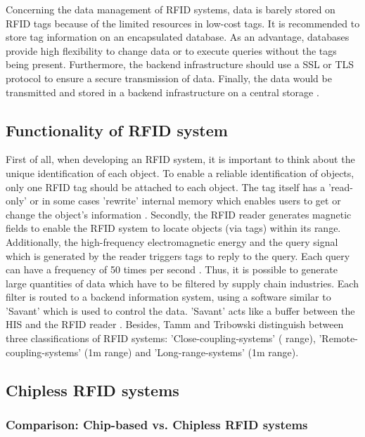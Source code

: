 Concerning the data management of RFID systems, data is barely stored on RFID tags because of the limited resources in low-cost tags. It is recommended \cite{henrici} to store tag information on an encapsulated database. As an advantage, databases provide high flexibility to change data or to execute queries without the tags being present. Furthermore, the backend infrastructure should use a \ac{SSL} or \ac{TLS} protocol to ensure a secure transmission of data. Finally, the data would be transmitted and stored in a backend infrastructure on a central storage \cite{henrici}.

\subsection{Functionality of RFID system} \label{chipless}

First of all, when developing an RFID system, it is important to think about the unique identification of each object. To enable a reliable identification of objects, only one RFID tag should be attached to each object. The tag itself has a 'read-only' or in some cases 'rewrite' internal memory which enables users to get or change the object's information \cite{ncbi}. 
Secondly, the RFID reader generates magnetic fields to enable the RFID system to locate objects (via tags) within its range. Additionally, the high-frequency electromagnetic energy and the query signal which is generated by the reader triggers tags to reply to the query. Each query can have a frequency of 50 times per second \cite{ncbi}. Thus, it is possible to generate large quantities of data which have to be filtered by supply chain industries. Each filter is routed to a backend information system, using a software similar to 'Savant' which is used to control the data. 'Savant' acts like a buffer between the \ac{HIS} and the RFID reader \cite{ncbi}.
Besides, Tamm and Tribowski \cite[p.18 ff.]{fokus} distinguish between three classifications of RFID systems: 'Close-coupling-systems' (\le 1cm range), 'Remote-coupling-systems' (\le 1m range) and 'Long-range-systems' (\g 1m range). 

\subsection{Chipless RFID systems}

\subsubsection{Comparison: Chip-based vs. Chipless RFID systems} 

